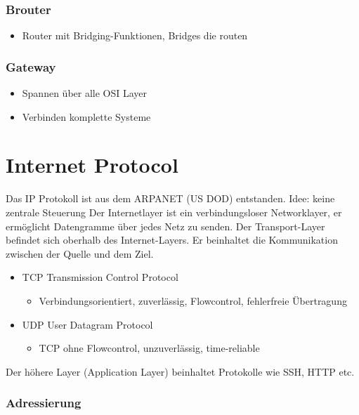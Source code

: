 \subsubsection*{Brouter}
\begin{itemize}
\item Router mit Bridging-Funktionen, Bridges die routen
\end{itemize}

\subsubsection*{Gateway}
\begin{itemize}
\item Spannen über alle OSI Layer
\item Verbinden komplette Systeme
\end{itemize}

\section*{Internet Protocol}

Das IP Protokoll ist aus dem ARPANET (US DOD) entstanden. Idee: keine
zentrale Steuerung Der Internetlayer ist ein verbindungsloser Networklayer,
er ermöglicht Datengramme über jedes Netz zu senden. Der Transport-Layer
befindet sich oberhalb des Internet-Layers. Er beinhaltet die Kommunikation
zwischen der Quelle und dem Ziel.
\begin{itemize}
\item TCP Transmission Control Protocol

\begin{itemize}
\item Verbindungsorientiert, zuverlässig, Flowcontrol, fehlerfreie Übertragung
\end{itemize}
\item UDP User Datagram Protocol

\begin{itemize}
\item TCP ohne Flowcontrol, unzuverlässig, time-reliable
\end{itemize}
\end{itemize}
Der höhere Layer (Application Layer) beinhaltet Protokolle wie SSH,
HTTP etc.


\subsubsection*{Adressierung}

